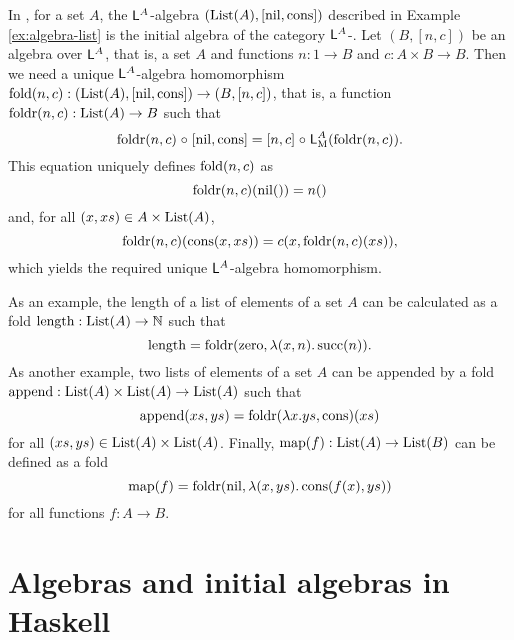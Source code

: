 \begin{example}
  \label{ex:initial-algebra-list}


  In \set, for a set $A$, the $\mathsf{L}^{A}$-algebra
  $(\text{List}(A),[\operatorname{nil},\operatorname{cons}])$ described in Example
  \ref{ex:algebra-list} is the initial algebra of the category
  $\mathsf{L}^{A}$-\alg. Let $(B,[n,c])$ be an algebra over
  $\mathsf{L}^{A}$, that is, a set $A$ and functions $n: 1 \to B$ and
  $c: A \times B \to B$. Then we need a unique $\mathsf{L}^{A}$-algebra
  homomorphism $\operatorname{fold}(n,c): (\text{List}(A),[\operatorname{nil},\operatorname{cons}]) \to (B,[n,c])$,
  that is, a function $\operatorname{foldr}(n,c): \text{List}(A) \to B$ such that
  \begin{equation*}
    \operatorname{foldr}(n,c) \mathrel{\circ} [\operatorname{nil},\operatorname{cons}] = [n,c] \mathrel{\circ} \mathsf{L}_{\operatorname{M}}^{A}(\operatorname{foldr}(n,c))
    \text{.}
  \end{equation*}
  This equation uniquely defines $\operatorname{fold}(n,c)$ as
  \begin{equation*}
    \operatorname{foldr}(n,c)(\operatorname{nil}()) = n()
  \end{equation*}
  and, for all $(x,xs) \in A \times \text{List}(A)$,
  \begin{equation*}
    \operatorname{foldr}(n,c)(\operatorname{cons}(x,xs)) = c(x,\operatorname{foldr}(n,c)(xs))
    \text{,}
  \end{equation*}
  which yields the required unique $\mathsf{L}^{A}$-algebra
  homomorphism.

  As an example, the length of a list of elements of a set $A$ can be
  calculated as a fold $\operatorname{length}: \text{List}(A) \to \mathbb{N}$ such that
  \begin{equation*}
    \operatorname{length} = \operatorname{foldr}(\operatorname{zero},\lambda(x,n).\operatorname{succ}(n))
    \text{.}
  \end{equation*}
  As another example, two lists of elements of a set $A$ can be
  appended by a fold $\operatorname{append}: \text{List}(A) \times \text{List}(A) \to
  \text{List}(A)$ such that
  \begin{equation*}
    \operatorname{append}(xs,ys) = \operatorname{foldr}(\lambda x.ys,\operatorname{cons})(xs)
  \end{equation*}
  for all $(xs,ys) \in \text{List}(A) \times \text{List}(A)$. Finally,
  $\operatorname{map}(f): \text{List}(A) \to \text{List}(B)$ can be defined as a fold
  \begin{equation*}
    \operatorname{map}(f) = \operatorname{foldr}(\operatorname{nil},\lambda(x,ys).\operatorname{cons}(f(x),ys))
  \end{equation*}
  for all functions $f: A \to B$.

\end{example}

\section{Algebras and initial algebras in Haskell}
\label{sec:algebras-haskell}

